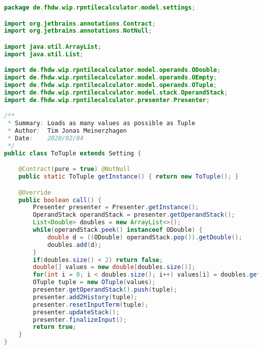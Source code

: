 \begin{lstlisting}[caption=ToTuple (Meinerzhagen),label=list:ToTuple,language=Java]
package de.fhdw.wip.rpntilecalculator.model.settings;

import org.jetbrains.annotations.Contract;
import org.jetbrains.annotations.NotNull;

import java.util.ArrayList;
import java.util.List;

import de.fhdw.wip.rpntilecalculator.model.operands.ODouble;
import de.fhdw.wip.rpntilecalculator.model.operands.OEmpty;
import de.fhdw.wip.rpntilecalculator.model.operands.OTuple;
import de.fhdw.wip.rpntilecalculator.model.stack.OperandStack;
import de.fhdw.wip.rpntilecalculator.presenter.Presenter;

/**
 * Summary: Loads as many values as possible as Tuple
 * Author:  Tim Jonas Meinerzhagen
 * Date:    2020/02/04
 */
public class ToTuple extends Setting {

    @Contract(pure = true) @NotNull
    public static ToTuple getInstance() { return new ToTuple(); }

    @Override
    public boolean call() {
        Presenter presenter = Presenter.getInstance();
        OperandStack operandStack = presenter.getOperandStack();
        List<Double> doubles = new ArrayList<>();
        while(operandStack.peek() instanceof ODouble) {
            double d = ((ODouble) operandStack.pop()).getDouble();
            doubles.add(d);
        }
        if(doubles.size() < 2) return false;
        double[] values = new double[doubles.size()];
        for(int i = 0; i < doubles.size(); i++) values[i] = doubles.get(i);
        OTuple tuple = new OTuple(values);
        presenter.getOperandStack().push(tuple);
        presenter.add2History(tuple);
        presenter.resetInputTerm(tuple);
        presenter.updateStack();
        presenter.finalizeInput();
        return true;
    }
}
\end{lstlisting} 

